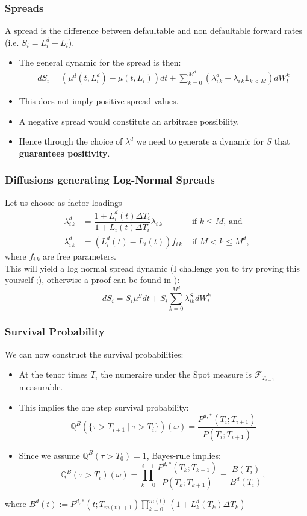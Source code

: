 \documentclass{beamer}
\begin{document}
	\begin{frame}
		\frametitle{Spreads}
		A spread is the difference between defaultable and non defaultable forward rates (i.e. $S_i = L^d_i - L_i$).
		\begin{itemize}
			\item The general dynamic for the spread is then:
			\begin{align*}
			dS_i = (\mu^d(t, L_i^d)- \mu(t, L_i))dt + \sum_{k=0}^{M^d}(\lambda^d_{i \, k} - \lambda_{i \, k} \mathbf{1}_{k < M}) dW^k_t
			\end{align*}
			\item This does not imply positive spread values.
			\item A negative spread would constitute an arbitrage possibility.
			\item Hence through the choice of $\lambda^d $ we need to generate a dynamic for $S$ that \textbf{guarantees positivity}.
		\end{itemize}
	\end{frame}
	
	\begin{frame}
		\frametitle{Diffusions generating Log-Normal Spreads}
		Let us choose as factor loadings
		\begin{align*}
		\lambda_{i \, k}^d &= \dfrac{1+L^d_i(t)\Delta T_i}{1+L_i(t)\Delta T_i} \lambda_{i \, k}
		\quad & \text{ if } k \leq M \text{, and}\\
		\lambda_{i \, k}^d &= (L^d_i(t) - L_i(t)) f_{i \, k}
		&\text{ if } M < k \leq M^d \text{,}
		\end{align*}
		where $f_{i \, k}$ are free parameters.\\
		This will yield a log normal spread dynamic (I challenge you to try proving this yourself ;), otherwise a proof can be found in \cite{friesDLMM}):
		\[dS_i = S_i\mu^Sdt + S_i \sum_{k=0}^{M^d}\lambda^S_{i k}dW^k_t\]
	\end{frame}
	
	\begin{frame}
		\frametitle{Survival Probability}
		We can now construct the survival probabilities:
		\begin{itemize}
			\item At the tenor times $T_i$ the numeraire under the Spot measure is $\mathcal{F}_{T_{i-1}}$ measurable.
			\item This implies the one step survival probability:
			\[\mathbb{Q}^B(\{\tau > T_{i+1} \;|\;\tau > T_i\})(\omega) = \frac{P^{d,*}(T_i;T_{i+1})}{P(T_i;T_{i+1})}\]
			\item Since we assume $\mathbb{Q}^B(\tau > T_0) = 1$, Bayes-rule implies:
			\[\mathbb{Q}^B(\tau > T_i)(\omega) = \prod_{k=0}^{i-1}\frac{P^{d,*}(T_k;T_{k+1})}{P(T_k;T_{k+1})} = \frac{B(T_i)}{B^d(T_i)},\]
		\end{itemize}
		where \(B^d(t) := P^{d,*}(t;T_{m(t)+1})\prod_{k=0}^{m(t)}(1+L^d_k(T_k)\Delta T_k)\)
	\end{frame}
	
\end{document}
